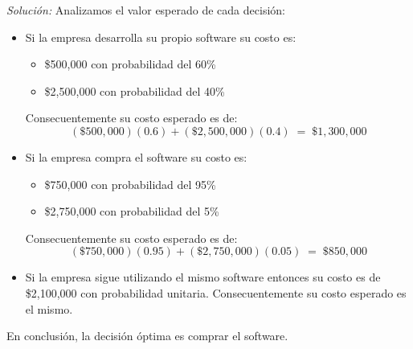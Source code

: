 \documentclass[ a4paper, twoside, 11pt]{article}
\begin{document}
\begin{problem}
\emph{Soluci\'on:} Analizamos el valor esperado de cada decisi\'on:
\begin{itemize}
\item Si la empresa desarrolla su propio software su costo es:
\begin{itemize}
\item \$500,000 con probabilidad del 60\%
\item \$2,500,000 con probabilidad del 40\%
\end{itemize}
Consecuentemente su costo esperado es de:
\[
(\$500,000)(0.6) + (\$2,500,000)(0.4) \; = \; \$1,300,000
\]
\item Si la empresa compra el software su costo es:
\begin{itemize}
\item \$750,000 con probabilidad del 95\%
\item \$2,750,000 con probabilidad del 5\%
\end{itemize}
Consecuentemente su costo esperado es de:
\[
(\$750,000)(0.95) + (\$2,750,000)(0.05) \; = \; \$850,000
\]
\item Si la empresa sigue utilizando el mismo software entonces su costo es de \$2,100,000 con probabilidad unitaria. Consecuentemente su costo esperado es el mismo.
\end{itemize}
En conclusi\'on, la decisi\'on \'optima es comprar el software.

\end{problem}
\vspace{\baselineskip}
\end{document}
